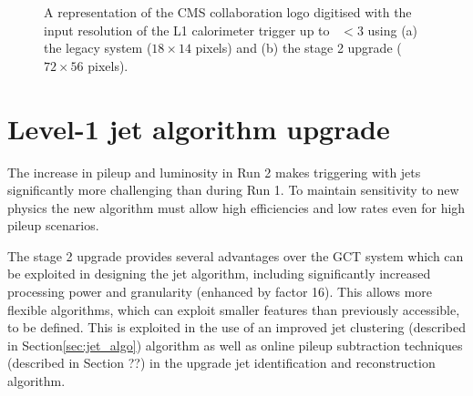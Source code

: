 \begin{figure}
\centering
{} \quad
{} 
\caption{A representation of the CMS collaboration logo digitised with the input resolution of the L1 calorimeter trigger up to 
\etaabs~$< 3$ using (a) the legacy system ($18 \times 14$ pixels) and (b) the stage 2 upgrade ($72 \times 56$ pixels).}
\label{fig:inputres}
\end{figure}

\section{Level-1 jet algorithm upgrade}
\label{algo}

The increase in pileup and luminosity in Run 2 makes triggering with jets
significantly more challenging than during Run 1. To maintain sensitivity to
new physics the new algorithm must allow high efficiencies and
low rates even for high pileup scenarios.

The stage 2 upgrade provides several advantages over the GCT system which can be 
exploited in designing the jet algorithm, including significantly increased processing power
and granularity (enhanced by factor 16). This allows more flexible algorithms, which can 
exploit smaller features than previously accessible, to be defined. This is exploited in the 
use of an improved jet clustering (described in Section\ref{sec:jet_algo}) algorithm as well as 
online pileup subtraction techniques (described in Section ??) in the upgrade jet 
identification and reconstruction algorithm.

